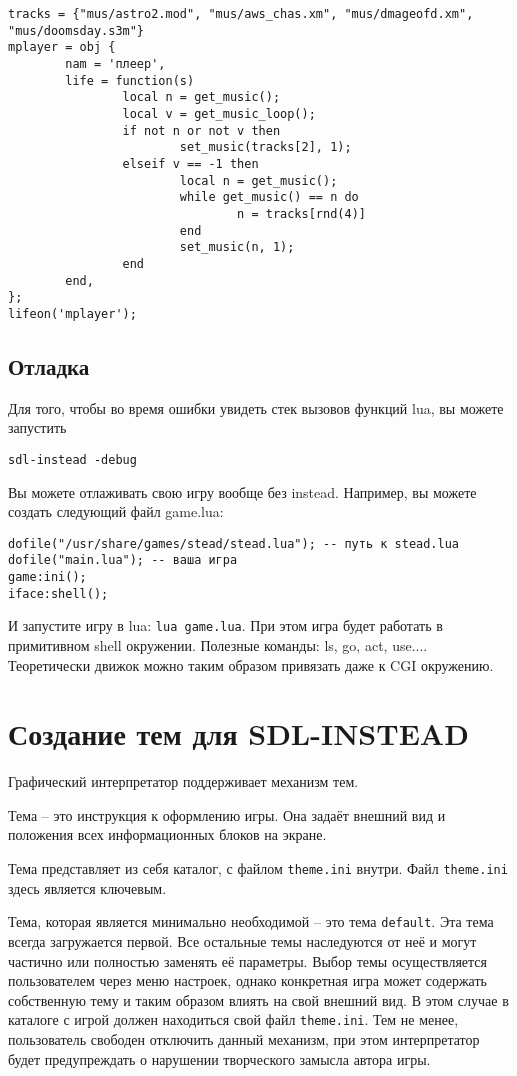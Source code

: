 \documentclass[a4paper,12pt]{article}
\begin{document}
\begin{verbatim}
tracks = {"mus/astro2.mod", "mus/aws_chas.xm", "mus/dmageofd.xm", "mus/doomsday.s3m"}
mplayer = obj {
        nam = 'плеер',
        life = function(s)
                local n = get_music();
                local v = get_music_loop();
                if not n or not v then
                        set_music(tracks[2], 1);
                elseif v == -1 then
                        local n = get_music();
                        while get_music() == n do
                                n = tracks[rnd(4)]
                        end
                        set_music(n, 1);
                end
        end,
};
lifeon('mplayer');
\end{verbatim}

\subsection{Отладка}
Для того, чтобы во время ошибки увидеть стек вызовов функций lua, вы можете запустить 

\begin{verbatim}
sdl-instead -debug
\end{verbatim}

Вы можете отлаживать свою игру вообще без instead. Например, вы можете создать следующий файл game.lua:

\begin{verbatim}
dofile("/usr/share/games/stead/stead.lua"); -- путь к stead.lua
dofile("main.lua"); -- ваша игра
game:ini();
iface:shell();
\end{verbatim}

И запустите игру в lua: \verb/lua game.lua/. При этом игра будет работать в примитивном shell окружении. Полезные команды: ls, go, act, use.... Теоретически движок можно таким образом привязать даже к CGI окружению.

\section{Создание тем для SDL-INSTEAD}

Графический интерпретатор поддерживает механизм тем. 

Тема -- это инструкция к оформлению игры. Она задаёт внешний вид и положения всех информационных блоков на экране.

Тема представляет из себя каталог, с файлом \verb/theme.ini/ внутри. Файл \verb/theme.ini/ здесь является ключевым.

Тема, которая является минимально необходимой -- это тема \verb/default/. Эта тема всегда загружается первой. Все остальные темы наследуются от неё и могут частично или полностью заменять её параметры. Выбор темы осуществляется пользователем через меню настроек, однако конкретная игра может содержать собственную тему и таким образом влиять на свой внешний вид. В этом случае в каталоге с игрой должен находиться свой файл \verb/theme.ini/. Тем не менее, пользователь свободен отключить данный механизм, при этом интерпретатор будет предупреждать о нарушении творческого замысла автора игры.
\end{document}
